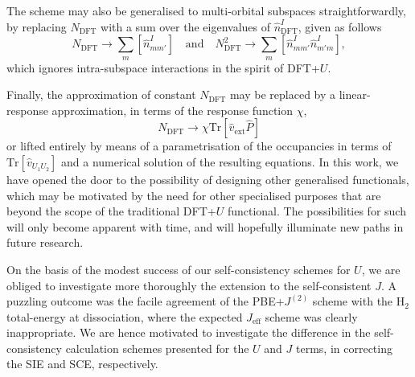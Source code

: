 The scheme may also be generalised to 
multi-orbital subspaces straightforwardly, 
by replacing $N_\textrm{DFT}$ 
with a sum over the eigenvalues of 
$\hat{n}^I_\textrm{DFT}$, 
given as follows 
%
\begin{equation}
N_\textrm{DFT} \to \sum_{m}\left[\hat{n}^I_{mm'}\right]
\quad\mbox{and}\quad
N_\textrm{DFT}^2 \to \sum_{m}\left[\hat{n}^I_{mm'}\hat{n}^I_{m'm}\right], 
\end{equation}
%
which ignores intra-subspace interactions 
in the spirit of DFT+$U$.

Finally, the approximation of constant $N_\textrm{DFT}$ 
may be replaced by a linear-response approximation, 
in terms of the response function $\chi$, 
%
\begin{equation}
N_\textrm{DFT}\to \chi \textrm{Tr}[\hat{v}_\textrm{ext}\hat{P}]
\end{equation}
%
or lifted entirely by means of
a  parametrisation of the occupancies in terms of 
$\textrm{Tr}\left[ \hat{v}_{U_1 U_2} \right] $ 
and a numerical solution of 
the resulting equations.
%
In this work, we have opened the door to 
the possibility of designing other generalised functionals, 
which may be motivated by the need for other specialised purposes 
that are beyond the scope of the traditional DFT+$U$ functional.
%
The possibilities for such will only become apparent with time, 
and will hopefully illuminate new paths in future research.

%


On the basis of the modest success of 
our self-consistency schemes for $U$, 
we are obliged to investigate more thoroughly 
the extension to the self-consistent $J$.
%
A puzzling outcome was the 
facile agreement of the PBE+$J^{(2)}$ scheme 
with the H$_2$ total-energy at dissociation, 
where the expected $J_\textrm{eff}$ scheme 
was clearly inappropriate.
%
We are hence motivated to investigate 
the difference in the self-consistency calculation schemes 
presented for the $U$ and $J$ terms, 
in correcting the SIE and SCE, respectively.

